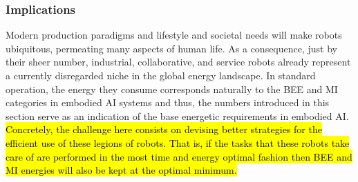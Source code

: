 \subsubsection{Implications}
Modern production paradigms and lifestyle and societal needs will make robots ubiquitous, permeating many aspects of human life. As a consequence, just by their sheer number, industrial, collaborative, and service robots already represent a currently disregarded niche in the global energy landscape. In standard operation, the energy they consume corresponds naturally to the BEE and MI categories in embodied AI systems and thus, the numbers introduced in this section serve as an indication of the base energetic requirements in embodied AI. \hl{Concretely, the challenge here consists on devising better strategies for the efficient use of these legions of robots. That is, if the tasks that these robots take care of are performed in the most time and energy optimal fashion then BEE and MI energies will also be kept at the optimal minimum.}
